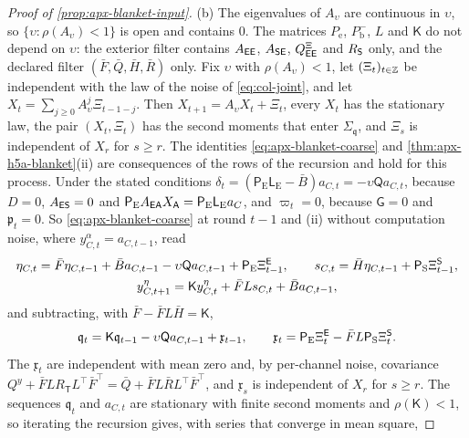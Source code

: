 \begin{proof}[Proof of \cref{prop:apx-blanket-input}]
(b) The eigenvalues of $A_\upsilon$ are continuous in $\upsilon$, so $\{\upsilon:\rho(A_\upsilon)<1\}$ is open and contains $0$. The matrices $P_{\mathrm e}$, $P^-_{\mathrm b}$, $L$ and $\mathsf K$ do not depend on $\upsilon$: the exterior filter contains $A_{\mathsf{E}\mathsf{E}}$, $A_{\mathsf{S}\mathsf{E}}$, $Q^{\Xi}_{\mathsf{E}\mathsf{E}}$ and $R_{\mathsf{S}}$ only, and the declared filter $(\bar F,\bar Q,\bar H,\bar R)$ only. Fix $\upsilon$ with $\rho(A_\upsilon)<1$, let $(\Xi_t)_{t\in\mathbb{Z}}$ be independent with the law of the noise of \eqref{eq:col-joint}, and let $X_t=\sum_{j\ge0}A_\upsilon^j\Xi_{t-1-j}$. Then $X_{t+1}=A_\upsilon X_t+\Xi_t$, every $X_t$ has the stationary law, the pair $(X_t,\Xi_t)$ has the second moments that enter $\Sigma_{\mathfrak q}$, and $\Xi_s$ is independent of $X_r$ for $s\ge r$. The identities \eqref{eq:apx-blanket-coarse} and \cref{thm:apx-h5a-blanket}(ii) are consequences of the rows of the recursion and hold for this process. Under the stated conditions $\delta_t=(\mathsf P_{\mathrm E}\mathsf L_{\mathrm E}-\bar B)a_{C,t}=-\upsilon\mathsf Qa_{C,t}$, because $D=0$, $A_{\mathsf{E}\mathsf{S}}=0$ and $\mathsf P_{\mathrm E}A_{\mathsf{E}\mathsf{A}}X_{\mathsf{A}}=\mathsf P_{\mathrm E}\mathsf L_{\mathrm E}a_C$, and $\varpi_t=0$, because $\mathsf G=0$ and $\mathfrak p_t=0$. So \eqref{eq:apx-blanket-coarse} at round $t-1$ and (ii) without computation noise, where $y^\alpha_{C,t}=a_{C,t-1}$, read
\begin{equation*}
\begin{gathered}
\eta_{C,t}=\bar F\eta_{C,t-1}+\bar Ba_{C,t-1}-\upsilon\mathsf Qa_{C,t-1}+\mathsf P_{\mathrm E}\Xi^{\mathsf{E}}_{t-1},\qquad s_{C,t}=\bar H\eta_{C,t-1}+\mathsf P_{\mathrm S}\Xi^{\mathsf{S}}_{t-1},\\
y^\eta_{C,t+1}=\mathsf Ky^\eta_{C,t}+\bar FLs_{C,t}+\bar Ba_{C,t-1},
\end{gathered}
\end{equation*}
and subtracting, with $\bar F-\bar FL\bar H=\mathsf K$,
\begin{equation*}
\mathfrak q_t=\mathsf K\mathfrak q_{t-1}-\upsilon\mathsf Qa_{C,t-1}+\mathfrak x_{t-1},\qquad\mathfrak x_t=\mathsf P_{\mathrm E}\Xi^{\mathsf{E}}_t-\bar FL\mathsf P_{\mathrm S}\Xi^{\mathsf{S}}_t .
\end{equation*}
The $\mathfrak x_t$ are independent with mean zero and, by per-channel noise, covariance $Q^y+\bar FLR_{\mathsf T}L^\top\bar F^\top=\bar Q+\bar FL\bar RL^\top\bar F^\top$, and $\mathfrak x_s$ is independent of $X_r$ for $s\ge r$. The sequences $\mathfrak q_t$ and $a_{C,t}$ are stationary with finite second moments and $\rho(\mathsf K)<1$, so iterating the recursion gives, with series that converge in mean square,

\end{proof}
